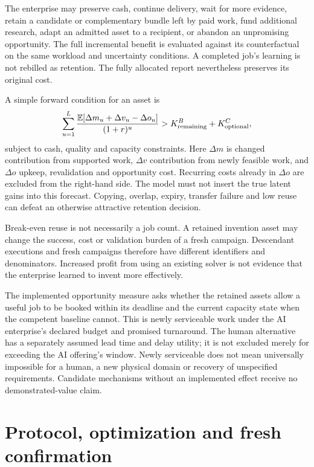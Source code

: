 \documentclass[11pt,a4paper]{article}
\begin{document}
The enterprise may preserve cash, continue delivery, wait for more evidence, retain a candidate or complementary bundle left by paid work, fund additional research, adapt an admitted asset to a recipient, or abandon an unpromising opportunity. The full incremental benefit is evaluated against its counterfactual on the same workload and uncertainty conditions. A completed job's learning is not rebilled as retention. The fully allocated report nevertheless preserves its original cost.

A simple forward condition for an asset is
\begin{equation}
\sum_{u=1}^{L}\frac{\mathbb{E}[\Delta m_u+\Delta v_u-\Delta o_u]}{(1+r)^u}>K^{B}_{\rm remaining}+K^{C}_{\rm optional},
\end{equation}
subject to cash, quality and capacity constraints. Here $\Delta m$ is changed contribution from supported work, $\Delta v$ contribution from newly feasible work, and $\Delta o$ upkeep, revalidation and opportunity cost. Recurring costs already in $\Delta o$ are excluded from the right-hand side. The model must not insert the true latent gains into this forecast. Copying, overlap, expiry, transfer failure and low reuse can defeat an otherwise attractive retention decision.

Break-even reuse is not necessarily a job count. A retained invention asset may change the success, cost or validation burden of a fresh campaign. Descendant executions and fresh campaigns therefore have different identifiers and denominators. Increased profit from using an existing solver is not evidence that the enterprise learned to invent more effectively.

The implemented opportunity measure asks whether the retained assets allow a useful job to be booked within its deadline and the current capacity state when the competent baseline cannot. This is newly serviceable work under the AI enterprise’s declared budget and promised turnaround. The human alternative has a separately assumed lead time and delay utility; it is not excluded merely for exceeding the AI offering’s window. Newly serviceable does not mean universally impossible for a human, a new physical domain or recovery of unspecified requirements. Candidate mechanisms without an implemented effect receive no demonstrated-value claim.

\section{Protocol, optimization and fresh confirmation}
\end{document}

